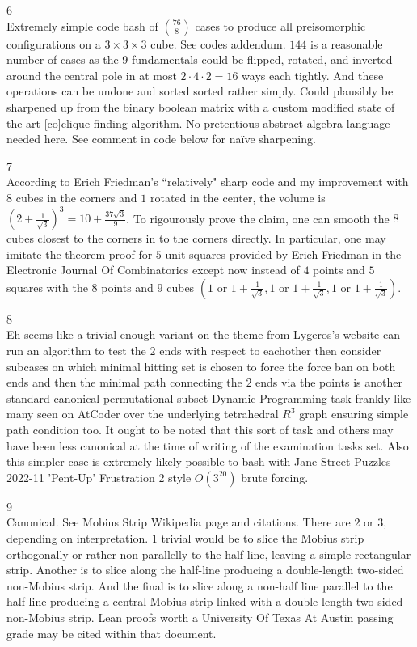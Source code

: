6 \\
Extremely simple code bash of $\binom{76}{8}$ cases to produce all preisomorphic configurations on a $3 \times 3 \times 3$ cube. See codes addendum. $144$ is a reasonable number of cases as the $9$ fundamentals could be flipped, rotated, and inverted around the central pole in at most $2 \cdot 4 \cdot 2 = 16$ ways each tightly. And these operations can be undone and sorted sorted rather simply. Could plausibly be sharpened up from the binary boolean matrix with a custom modified state of the art [co]clique finding algorithm. No pretentious abstract algebra language needed here. See comment in code below for naïve sharpening.

7 \\
According to Erich Friedman's ``relatively" sharp code and my improvement with $8$ cubes in the corners and $1$ rotated in the center, the volume is $\left( 2 + \frac{1}{\sqrt{3}} \right)^3 = \boxed{10 + \frac{37 \sqrt{3}}{9}}$. To rigourously prove the claim, one can smooth the $8$ cubes closest to the corners in to the corners directly. In particular, one may imitate the theorem proof for $5$ unit squares provided by Erich Friedman in the Electronic Journal Of Combinatorics except now instead of $4$ points and $5$ squares with the $8$ points and $9$ cubes $\left( 1 \text{ or }1+\frac{1}{\sqrt{3}},1 \text{ or }1+\frac{1}{\sqrt{3}},1 \text{ or }1+\frac{1}{\sqrt{3}} \right)$.

8 \\
Eh seems like a trivial enough variant on the theme from Lygeros's website can run an algorithm to test the $2$ ends with respect to eachother then consider subcases on which minimal hitting set is chosen to force the force ban on both ends and then the minimal path connecting the $2$ ends via the points is another standard canonical permutational subset Dynamic Programming task frankly like many seen on AtCoder over the underlying tetrahedral $R^3$ graph ensuring simple path condition too. It ought to be noted that this sort of task and others may have been less canonical at the time of writing of the examination tasks set. Also this simpler case is extremely likely possible to bash with Jane Street Puzzles 2022-11 'Pent-Up' Frustration 2 style $O\left( 3^20 \right)$ brute forcing.

9 \\
Canonical. See Mobius Strip Wikipedia page and citations. There are $2$ or $\boxed{3}$, depending on interpretation. $1$ trivial would be to slice the Mobius strip orthogonally or rather non-parallelly to the half-line, leaving a simple rectangular strip. Another is to slice along the half-line producing a double-length two-sided non-Mobius strip. And the final is to slice along a non-half line parallel to the half-line producing a central Mobius strip linked with a double-length two-sided non-Mobius strip. Lean proofs worth a University Of Texas At Austin passing grade may be cited within that document.

